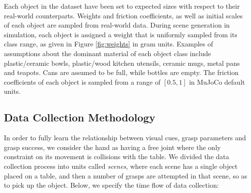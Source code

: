 Each object in the dataset have been set to expected sizes with respect to their real-world counterparts. Weights and friction coefficients, as well as initial scales of each object  are sampled from real-world data. During scene generation in simulation, each object is assigned a weight that is uniformly sampled from its class range, as given in Figure \ref{fig:weights} in gram units. Examples of assumptions about the dominant material of each object class include plastic/ceramic bowls, plastic/wood kitchen utensils, ceramic mugs, metal pans and teapots. Cans are assumed to be full, while bottles are empty. The friction coefficients of each object is sampled from a range of $[0.5, 1]$ in MuJoCo default units. 

\begin{table}[]
\centering
\caption{Weight ranges for each object class. }
\label{fig:weights}
\end{table}



\subsection{Data Collection Methodology}
\label{subsection:dataCollection}

In order to fully learn the relationship between visual cues, grasp parameters and grasp success, we  consider the hand as having a free joint where the only constraint on its movement is collisions with the table. We divided the data collection process into units called \textit{scenes}, where each scene has a single object placed on a table, and then a number of grasps are attempted in that scene, so as to pick up the object. Below, we specify the time flow of data collection:

